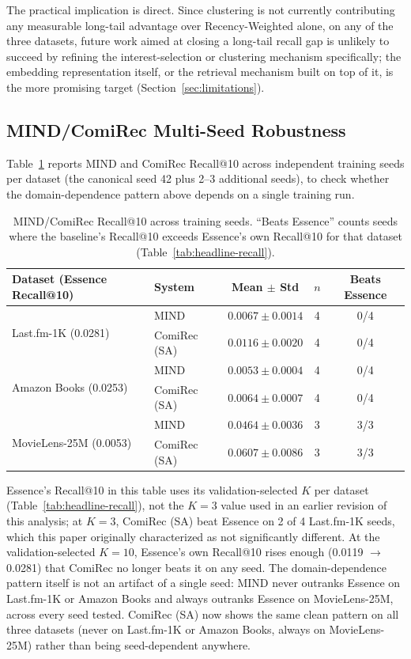 \documentclass[11pt,a4paper]{article}
\begin{document}
The practical implication is direct. Since clustering is not currently
contributing any measurable long-tail advantage over Recency-Weighted
alone, on any of the three datasets, future work aimed at closing a
long-tail recall gap is unlikely to succeed by refining the
interest-selection or clustering mechanism specifically; the embedding
representation itself, or the retrieval mechanism built on top of it, is
the more promising target (Section~\ref{sec:limitations}).

\subsection{MIND/ComiRec Multi-Seed Robustness}
\label{sec:multiseed}

Table~\ref{tab:multiseed} reports MIND and ComiRec Recall@10 across
independent training seeds per dataset (the canonical seed 42 plus 2--3
additional seeds), to check whether the domain-dependence pattern above
depends on a single training run.

\begin{table}[H]
\centering
\caption{MIND/ComiRec Recall@10 across training seeds. ``Beats Essence''
         counts seeds where the baseline's Recall@10 exceeds Essence's own
         Recall@10 for that dataset (Table~\ref{tab:headline-recall}).}
\label{tab:multiseed}
\small
\begin{tabular}{llccc}
\toprule
\textbf{Dataset (Essence Recall@10)} & \textbf{System} & \textbf{Mean $\pm$ Std} & $n$ & \textbf{Beats Essence} \\
\midrule
\multirow{2}{*}{Last.fm-1K (0.0281)} & MIND & $0.0067 \pm 0.0014$ & 4 & 0/4 \\
 & ComiRec (SA) & $0.0116 \pm 0.0020$ & 4 & 0/4 \\
\midrule
\multirow{2}{*}{Amazon Books (0.0253)} & MIND & $0.0053 \pm 0.0004$ & 4 & 0/4 \\
 & ComiRec (SA) & $0.0064 \pm 0.0007$ & 4 & 0/4 \\
\midrule
\multirow{2}{*}{MovieLens-25M (0.0053)} & MIND & $0.0464 \pm 0.0036$ & 3 & 3/3 \\
 & ComiRec (SA) & $0.0607 \pm 0.0086$ & 3 & 3/3 \\
\bottomrule
\end{tabular}
\end{table}

Essence's Recall@10 in this table uses its validation-selected $K$ per
dataset (Table~\ref{tab:headline-recall}), not the $K=3$ value used in an
earlier revision of this analysis; at $K=3$, ComiRec (SA) beat Essence on
2 of 4 Last.fm-1K seeds, which this paper originally characterized as
not significantly different. At the validation-selected $K=10$, Essence's own
Recall@10 rises enough (0.0119 $\to$ 0.0281) that ComiRec no longer beats
it on any seed. The domain-dependence pattern itself is not an artifact of
a single seed: MIND never outranks Essence on Last.fm-1K or Amazon Books
and always outranks Essence on MovieLens-25M, across every seed tested.
ComiRec (SA) now shows the same clean pattern on all three datasets
(never on Last.fm-1K or Amazon Books, always on MovieLens-25M) rather than
being seed-dependent anywhere.
\end{document}
